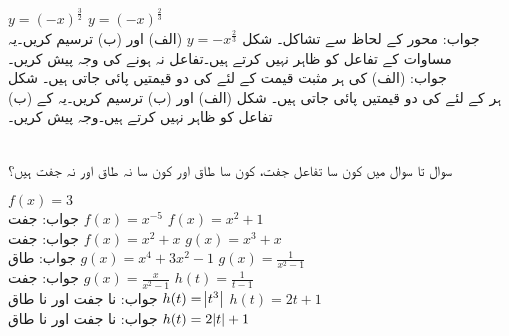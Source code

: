 $y=(-x)^{\tfrac{3}{2}}$
$y=(-x)^{\tfrac{2}{3}}$\\
جواب:\quad
{} محور کے لحاظ سے تشاکل۔ شکل 
$y=-x^{\tfrac{2}{3}}$
(الف)  اور (ب)  ترسیم کریں۔یہ مساوات  کے تفاعل کو ظاہر نہیں کرتے ہیں۔تفاعل نہ ہونے کی وجہ پیش کریں۔\\
جواب:\quad
(الف)  کی ہر مثبت قیمت کے لئے  کی دو قیمتیں پائی جاتی ہیں۔ شکل \\
(ب) ہر  کے لئے  کی دو قیمتیں پائی جاتی ہیں۔ شکل 
(الف)  اور (ب)  ترسیم کریں۔یہ  کے تفاعل کو ظاہر نہیں کرتے ہیں۔وجہ پیش کریں۔

\\
سوال  تا سوال  میں کون سا تفاعل جفت، کون سا طاق اور کون سا نہ طاق اور نہ جفت ہیں؟

$f(x)=3$\\
جواب:\quad
جفت
$f(x)=x^{-5}$
$f(x)=x^2+1$\\
جواب:\quad
جفت
$f(x)=x^2+x$
$g(x)=x^3+x$\\
جواب:\quad
طاق
$g(x)=x^4+3x^2-1$
$g(x)=\tfrac{1}{x^2-1}$\\
جواب:\quad
جفت
$g(x)=\tfrac{x}{x^2-1}$
$h(t)=\tfrac{1}{t-1}$\\
جواب:\quad
نا جفت اور نا طاق
$h(t)=\abs{t^3}$
$h(t)=2t+1$\\
جواب:\quad
نا جفت اور نا طاق
$h(t)=2\abs{t}+1$


